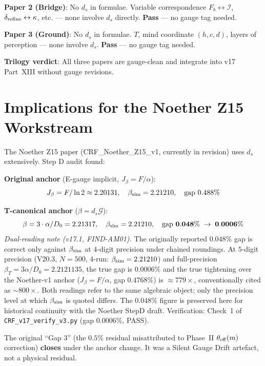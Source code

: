 \documentclass[12pt, a4paper]{article}
\begin{document}
\textbf{Paper 2 (Bridge)}: No $d_s$ in formulae. Variable correspondence
$F_b \leftrightarrow \mathcal{I}$, $\delta_{\rm refine} \leftrightarrow \kappa$,
etc. --- none involve $d_s$ directly. \textbf{Pass} --- no gauge tag needed.

\textbf{Paper 3 (Ground)}: No $d_s$ in formulae. $T$, mind coordinate $(h, c, d)$,
layers of perception --- none involve $d_s$. \textbf{Pass} --- no gauge tag needed.

\textbf{Trilogy verdict}: All three papers are gauge-clean and integrate into
v17 Part~XIII without gauge revisions.

\section{Implications for the Noether Z15 Workstream}

The Noether Z15 paper (CRF\_Noether\_Z15\_v1, currently in revision) uses
$d_s$ extensively. Step D audit found:

\begin{keybox}[title={Noether Layer 2 Anchor Switch (\boldmath$\sim 800\times$ Tightening, v17.1)}]
\textbf{Original anchor} (E-gauge implicit, $J_\beta = F/\alpha$):
\[
  J_\beta = F/\ln 2 \approx 2.20131, \quad \beta_{\rm sim} = 2.21210,
  \quad \text{gap } 0.488\%
\]

\textbf{T-canonical anchor} ($\beta = d_s\mathcal{G}$):
\[
  \beta = 3\cdot\alpha/D_0 = 2.21317, \quad \beta_{\rm sim} = 2.21210,
  \quad \text{gap } \mathbf{0.048\% \;\to\; 0.0006\%}
\]
\textit{Dual-reading note (v17.1, FIND-AM01).} The originally reported
$0.048\%$ gap is correct only against $\beta_{\rm sim}$ at $4$-digit
precision under chained roundings. At $5$-digit precision (V20.3,
$N=500$, 4-run: $\beta_{\rm sim} = 2.21210$) and full-precision
$\beta_T = 3\alpha/D_0 = 2.2121135$, the true gap is $0.0006\%$ and
the true tightening over the Noether-v1 anchor ($J_\beta = F/\alpha$,
gap $0.4768\%$) is $\approx 779\times$, conventionally cited as
$\sim 800\times$. Both readings refer to the same algebraic object;
only the precision level at which $\beta_{\rm sim}$ is quoted differs.
The $0.048\%$ figure is preserved here for historical continuity with
the Noether StepD draft. Verification: Check~1 of
\texttt{CRF\_v17\_verify\_v3.py} (gap $0.0006\%$, PASS).

The original ``Gap 3'' (the $0.5\%$ residual misattributed to Phase~II
$\theta_{\rm eff}(m)$ correction) \textbf{closes} under the anchor change.
It was a Silent Gauge Drift artefact, not a physical residual.
\end{keybox}
\end{document}
